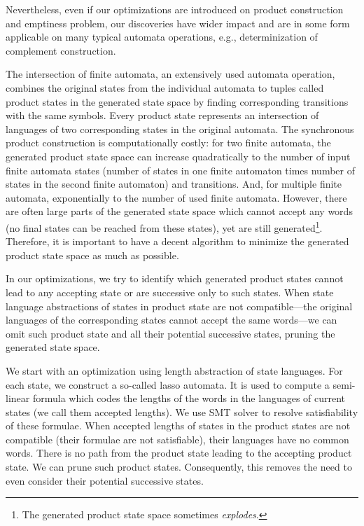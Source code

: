 Nevertheless, even if our optimizations are introduced on product construction and emptiness problem, our discoveries have wider impact and are in some form applicable on many typical automata operations, e.g., determinization of complement construction.


The intersection of finite automata, an extensively used automata operation, combines the original states from the individual automata to tuples called product states in the generated state space by finding corresponding transitions with the same symbols. Every product state represents an intersection of languages of two corresponding states in the original automata. The synchronous product construction is computationally costly: for two finite automata, the generated product state space can increase quadratically to the number of input finite automata states (number of states in one finite automaton times number of states in the second finite automaton) and transitions. And, for multiple finite automata, exponentially to the number of used finite automata. However, there are often large parts of the generated state space which cannot accept any words (no final states can be reached from these states), yet are still generated\footnote{The generated product state space sometimes \emph{explodes}.}. Therefore, it is important to have a decent algorithm to minimize the generated product state space as much as possible.


In our optimizations, we try to identify which generated product states cannot lead to any accepting state or are successive only to such states. When state language abstractions of states in product state are not compatible---the original languages of the corresponding states cannot accept the same words---we can omit such product state and all their potential successive states, pruning the generated state space.


We start with an optimization using length abstraction of state languages. For each state, we construct a so-called lasso automata. It is used to compute a semi-linear formula which codes the lengths of the words in the languages of current states (we call them accepted lengths). We use SMT solver to resolve satisfiability of these formulae. When accepted lengths of states in the product states are not compatible (their formulae are not satisfiable), their languages have no common words. There is no path from the product state leading to the accepting product state. We can prune such product states. Consequently, this removes the need to even consider their potential successive states.


